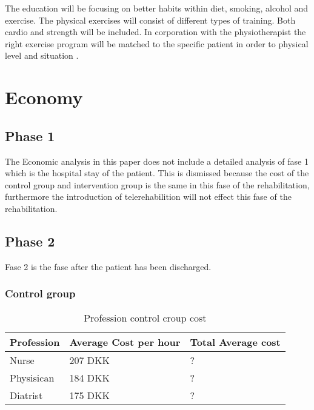 The education will be focusing on better habits within diet, smoking, alcohol and exercise. The physical exercises will consist of different types of training. Both cardio and strength will be included. In corporation with the physiotherapist the right exercise program will be matched to the specific patient in order to physical level and situation \cite{herning}. 



\section{Economy}

\subsection{Phase 1}

The Economic analysis in this paper does not include a detailed analysis of fase 1 which is the hospital stay of the patient. This is dismissed because the cost of the control group and intervention group is the same in this fase of the rehabilitation, furthermore the introduction of telerehabilition will not effect this fase of the rehabilitation. 


\subsection{Phase 2}

Fase 2 is the fase after the patient has been discharged. 

\subsubsection{Control group}
\begin{table}[H]
\begin{longtabu} to 
    \textbf{Profession} &        \textbf{Average Cost per hour} & \textbf{Total Average cost} \\[-1ex]
    \midrule
     Nurse   &    207 DKK & ? \\ \hline
    Physisican   &   184 DKK    & ? \\ \hline
    Diatrist    &     175 DKK    & ?
    \newline
   \end{longtabu}
\caption{Profession control croup cost \cite{lonnurse, lonfys, londia}}
\label{tab: PC}
\end{table}

